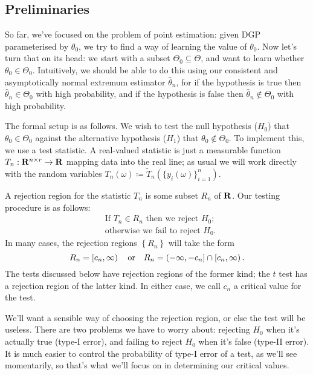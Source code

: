 \documentclass[11pt,letterpaper,reqno,oneside]{article}
\begin{document}
\subsection{Preliminaries}
\label{sec:hypothesis_testing:preliminaries}

So far, we've focused on the problem of point estimation: given DGP parameterised by $\theta_0$, we try to find a way of learning the value of $\theta_0$. Now let's turn that on its head: we start with a subset $\Theta_0 \subseteq \Theta$, and want to learn whether $\theta_0 \in \Theta_0$. Intuitively, we should be able to do this using our consistent and asymptotically normal extremum estimator $\widehat{\theta}_n$, for if the hypothesis is true then $\widehat{\theta}_n \in \Theta_0$ with high probability, and if the hypothesis is false then $\widehat{\theta}_n \notin \Theta_0$ with high probability.

The formal setup is as follows. We wish to test the null hypothesis ($H_0$) that $\theta_0 \in \Theta_0$ against the alternative hypothesis ($H_1$) that $\theta_0 \notin \Theta_0$. To implement this, we use a test statistic. A real-valued statistic is just a measurable function $T_n : \mathbf{R}^{n \times r} \to \mathbf{R}$ mapping data into the real line; as usual we will work directly with the random variables $T_n(\omega) \coloneqq \widetilde{T}_n\left( \{ y_i(\omega) \}_{i=1}^n \right)$.

A rejection region for the statistic $T_n$ is some subset $R_n$ of $\mathbf{R}$. Our testing procedure is as follows:
%
\begin{align*}
	&\text{If $T_n \in R_n$ 
	then we reject $H_0$;}
	\\
	&\text{otherwise we fail to reject $H_0$.}
\end{align*}
%
In many cases, the rejection regions $\left\{ R_n \right\}$ will take the form
%
\begin{equation*}
	R_n = \left[ c_n, \infty \right)
	\quad\text{or}\quad
	R_n = \left( -\infty, -c_n \right] 
	\cap \left[ c_n, \infty \right) .
\end{equation*}
%
The tests discussed below have rejection regions of the former kind; the $t$ test has a rejection region of the latter kind. In either case, we call $c_n$ a critical value for the test.


We'll want a sensible way of choosing the rejection region, or else the test will be useless. There are two problems we have to worry about: rejecting $H_0$ when it's actually true (type-I error), and failing to reject $H_0$ when it's false (type-II error). It is much easier to control the probability of type-I error of a test, as we'll see momentarily, so that's what we'll focus on in determining our critical values.
\end{document}
